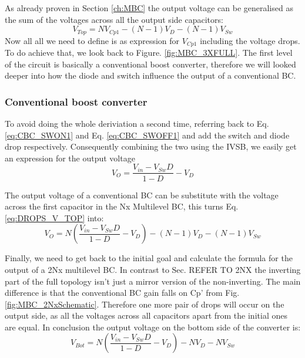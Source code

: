 As already proven in Section \ref{ch:MBC} the output voltage can be generalised as the sum of the voltages across all the output side capacitors: 
\begin{equation}
	V_{Top}= NV_{Cp1}-(N-1)V_D-(N-1)V_{Sw} 
	\label{eq:DROPS_V_TOP}
\end{equation}
Now all all we need to define is as expression for $V_{Cp1}$ including the voltage drops. To do achieve that, we look back to Figure. \ref{fig:MBC_3XFULL}. The first level of the circuit is basically a conventional boost converter, therefore we will looked deeper into how the diode and switch influence the output of a conventional BC. 
\vspace{2mm}
\subsubsection{Conventional boost converter}

To avoid doing the whole deriviation a second time, referring back to Eq. \ref{eq:CBC_SWON1} and Eq. \ref{eq:CBC_SWOFF1} and add the switch and diode drop respectively. Consequently combining the two using the IVSB, we easily get an expression for the output voltage \cite{BoostSwi93:online}
\vspace{2mm}
\begin{equation}
	V_{O}= \frac{V_{in}-V_{Sw}D}{1-D}-V_D
	\label{eq:DROPS_CONV}
\end{equation}

The output voltage of a conventional BC can be substitute with the voltage across the first capacitor in the Nx Multilevel BC, this turns Eq. \ref{eq:DROPS_V_TOP} into: 
\vspace{2mm}
\begin{equation}
	V_{O}= N( \frac{V_{in}-V_{Sw}D}{1-D}-V_D)-(N-1)V_D-(N-1)V_{Sw} 
	\label{eq:DROPS_NX_FINAL}
\end{equation}

Finally, we need to get back to the initial goal and calculate the formula for the output of a 2Nx multilevel BC. 
In contrast to Sec. REFER TO 2NX the inverting part of the full topology isn't just a mirror version of the non-inverting. The main difference is that the conventional BC gain falls on Cp' from Fig. \ref{fig:MBC_2NxSchematic}. Therefore one more pair of drops will occur on the output side, as all the voltages across all capacitors apart from the initial ones are equal. In conclusion the output voltage on the bottom side of the converter is:
\begin{equation}
	V_{Bot}= N(\frac{V_{in}-V_{Sw}D}{1-D}-V_D)-NV_D-NV_{Sw} 
	\label{eq:DROPS_V_BOT}
\end{equation}


